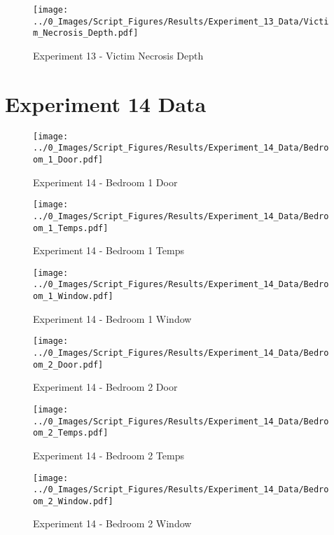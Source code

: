 	\clearpage

	\begin{figure}[H]
		\centering
		\texttt{[image: ../0\_Images/Script\_Figures/Results/Experiment\_13\_Data/Victim\_Necrosis\_Depth.pdf]}
		\caption[]{Experiment 13 - Victim Necrosis Depth}
	\end{figure}
 

\clearpage		\large
\section{Experiment 14 Data} \label{App:Exp14Results} 

	\begin{figure}[H]
		\centering
		\texttt{[image: ../0\_Images/Script\_Figures/Results/Experiment\_14\_Data/Bedroom\_1\_Door.pdf]}
		\caption[]{Experiment 14 - Bedroom 1 Door}
	\end{figure}
 

	\begin{figure}[H]
		\centering
		\texttt{[image: ../0\_Images/Script\_Figures/Results/Experiment\_14\_Data/Bedroom\_1\_Temps.pdf]}
		\caption[]{Experiment 14 - Bedroom 1 Temps}
	\end{figure}
 
	\clearpage

	\begin{figure}[H]
		\centering
		\texttt{[image: ../0\_Images/Script\_Figures/Results/Experiment\_14\_Data/Bedroom\_1\_Window.pdf]}
		\caption[]{Experiment 14 - Bedroom 1 Window}
	\end{figure}
 

	\begin{figure}[H]
		\centering
		\texttt{[image: ../0\_Images/Script\_Figures/Results/Experiment\_14\_Data/Bedroom\_2\_Door.pdf]}
		\caption[]{Experiment 14 - Bedroom 2 Door}
	\end{figure}
 
	\clearpage

	\begin{figure}[H]
		\centering
		\texttt{[image: ../0\_Images/Script\_Figures/Results/Experiment\_14\_Data/Bedroom\_2\_Temps.pdf]}
		\caption[]{Experiment 14 - Bedroom 2 Temps}
	\end{figure}
 

	\begin{figure}[H]
		\centering
		\texttt{[image: ../0\_Images/Script\_Figures/Results/Experiment\_14\_Data/Bedroom\_2\_Window.pdf]}
		\caption[]{Experiment 14 - Bedroom 2 Window}
	\end{figure}
 
